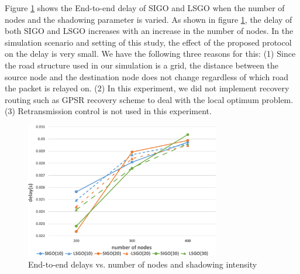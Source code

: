 \documentclass[conference]{IEEEtran}
\begin{document}
Figure \ref{fig:delay} shows the End-to-end delay of SIGO and LSGO when the number of nodes and the shadowing parameter is varied. 
As shown in figure \ref{fig:delay}, the delay of both SIGO and LSGO increases with an increase in the number of nodes. In the simulation scenario and setting of this study, the effect of the proposed protocol on the delay is very small. 
We have the following three reasons for this: 
(1) Since the road structure used in our simulation is a grid, the distance between the source node and the destination node does not change regardless of which road the packet is relayed on.
(2) In this experiment, we did not implement recovery routing such as GPSR recovery scheme to deal with the local optimum problem. (3) Retransmission control is not used in this experiment.







\begin{figure}[!ht]
\centering
\includegraphics[width=85mm]{figures/delay.eps}
\caption{End-to-end delays vs. number of nodes and shadowing intensity }
\label{fig:delay}
\end{figure}
\end{document}

